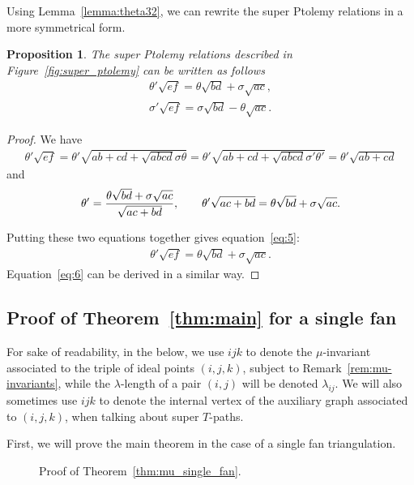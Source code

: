 \documentclass[pdftex]{sigma}
\numberwithin{equation}{section}
\newtheorem{Proposition}[Theorem]{Proposition}
 {\theoremstyle{Definition}
\newtheorem{Definition}[Theorem]{Definition}
\newtheorem{Example}[Theorem]{Example}
\newtheorem{Remark}[Theorem]{Remark}
\newtheorem{Question}[Theorem]{Question} }
\begin{document}
Using Lemma~\ref{lemma:theta32}, we can rewrite the super Ptolemy relations in a more symmetrical form.
\begin{Proposition}
The super Ptolemy relations described in Figure~{\rm \ref{fig:super_ptolemy}} can be written as follows
\begin{gather}
\theta'\sqrt{ef} =	\theta\sqrt{bd}+\sigma \sqrt{ac},\label{eq:5}\\
\sigma'\sqrt{ef} =\sigma\sqrt{bd}-\theta\sqrt{ac}.\label{eq:6}
\end{gather}
\end{Proposition}
\begin{proof}We have
\begin{gather*}
\theta'\sqrt{ef} =\theta'\sqrt{ab+cd+\sqrt{abcd}\sigma\theta}
 =\theta'\sqrt{ab+cd+\sqrt{abcd}\sigma'\theta'}
 =\theta'\sqrt{ab+cd}
\end{gather*}
and
\begin{gather*}
	\theta' = {{ \theta\sqrt{bd}+\sigma \sqrt{ac}}\over{\sqrt{ac+bd}}},\qquad
	\theta'\sqrt{ac+bd} = \theta\sqrt{bd}+\sigma \sqrt{ac}.
\end{gather*}
	
Putting these two equations together gives equation~\eqref{eq:5}:
\begin{align*}
\theta'\sqrt{ef}= \theta\sqrt{bd}+\sigma \sqrt{ac}.
\end{align*}
Equation~\eqref{eq:6} can be derived in a similar way.
\end{proof}

\subsection{Proof of Theorem~\ref{thm:main} for a single fan}

For sake of readability, in the below, we use $\boxed{ijk}$ to denote the $\mu$-invariant associated to the triple of
ideal points $(i,j,k)$, subject to Remark~\ref{rem:mu-invariants}, while the $\lambda$-length of a pair $(i,j)$ will be
denoted $\lambda_{ij}$. We will also sometimes use $\boxed{ijk}$ to denote the internal vertex of the auxiliary graph associated to $(i,j,k)$, when talking about super $T$-paths.

First, we will prove the main theorem in the case of a single fan triangulation.

\begin{figure}[h] \centering
 
 \caption{Proof of Theorem~\ref{thm:mu_single_fan}.} \label{fig:mu_single_fan}
\end{figure}
\end{document}
